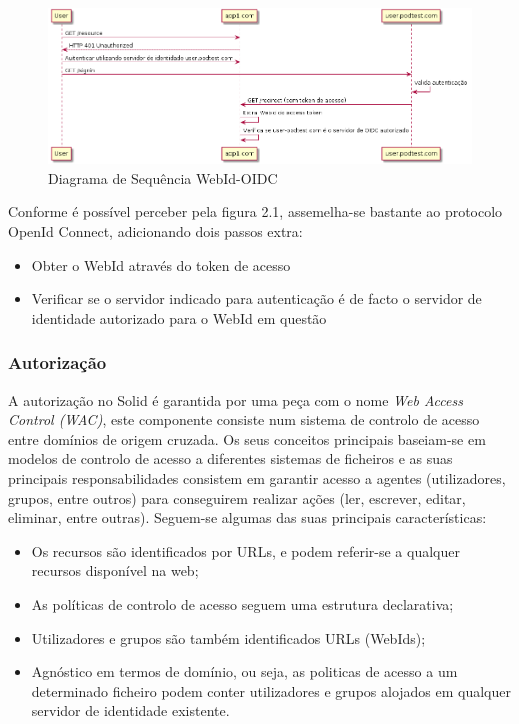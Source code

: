 \begin{figure}[H]
    \begin{center}
    \includegraphics[width=1 \textwidth]{figures/WedId-OIDC.png}
    \caption{Diagrama de Sequência WebId-OIDC}
    \end{center}
\end{figure}

Conforme é possível perceber pela figura 2.1, assemelha-se bastante ao protocolo OpenId Connect, adicionando dois passos extra:\cite{solid_webid_oidc}
\begin{itemize}
    \item Obter o WebId através do token de acesso
    \item Verificar se o servidor indicado para autenticação é de facto o servidor de identidade autorizado para o WebId em questão
\end{itemize}

\subsubsection{Autorização}
A autorização no Solid é garantida por uma peça com o nome \emph{Web Access Control (WAC)}, este componente consiste num sistema de controlo de acesso entre domínios de origem cruzada. Os seus conceitos principais baseiam-se em modelos de controlo de acesso a diferentes sistemas de ficheiros e as suas principais responsabilidades consistem em garantir acesso a agentes (utilizadores, grupos, entre outros) para conseguirem realizar ações (ler, escrever, editar, eliminar, entre outras).\cite{solid_web_access_control}
Seguem-se algumas das suas principais características:
\begin{itemize}
    \item Os recursos são identificados por URLs, e podem referir-se a qualquer recursos disponível na web;
    \item As políticas de controlo de acesso seguem uma estrutura declarativa;
    \item Utilizadores e grupos são também identificados URLs (WebIds);
    \item Agnóstico em termos de domínio, ou seja, as politicas de acesso a um determinado ficheiro podem conter utilizadores e grupos alojados em qualquer servidor de identidade existente.
\end{itemize}

